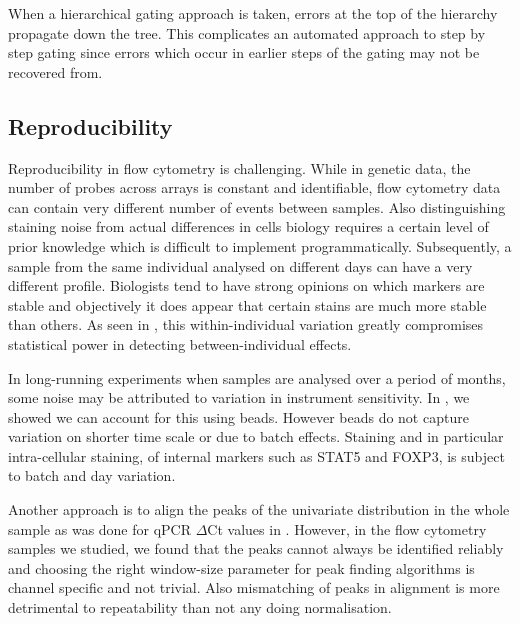 When a hierarchical gating approach is taken, errors at the top of the hierarchy propagate down the tree.
This complicates an automated approach to step by step gating since errors which occur in earlier steps of the gating may not be recovered from.

\subsection{Reproducibility}

Reproducibility in flow cytometry is challenging.
While in genetic data, the number of probes across arrays is constant and identifiable,
flow cytometry data can contain very different number of events between samples.
Also distinguishing staining noise from actual differences in cells biology requires a certain level of prior knowledge which is difficult to implement programmatically.
Subsequently, a sample from the same individual analysed on different days can have a very different profile.
Biologists tend to have strong opinions on which markers are stable and objectively it does appear that certain stains are much more stable than others.
As seen in , this within-individual variation greatly compromises statistical power in detecting between-individual effects.

In long-running experiments when samples are analysed over a period of months, some noise may be attributed to variation in instrument sensitivity.
In , we showed we can account for this using beads.
However beads do not capture variation on shorter time scale or due to batch effects.
Staining and in particular intra-cellular staining, of internal markers such as STAT5 and FOXP3, is subject to batch and day variation.

Another approach is to align the peaks of the univariate distribution in the whole sample as was done for qPCR $\Delta$Ct values in .
However, in the flow cytometry samples we studied, we found that the peaks cannot always be identified reliably and choosing the right window-size parameter for peak finding algorithms is channel specific and not trivial.
Also mismatching of peaks in alignment is more detrimental to repeatability than not any doing normalisation.






